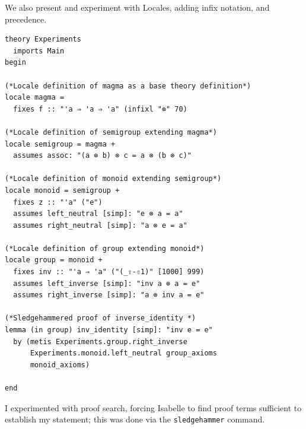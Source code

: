 \documentclass{article}
\begin{document}
We also present and experiment with Locales, adding infix notation,
and precedence.
\begin{lstlisting}
theory Experiments
  imports Main
begin

(*Locale definition of magma as a base theory definition*)
locale magma =
  fixes f :: "'a ⇒ 'a ⇒ 'a" (infixl "⊗" 70)

(*Locale definition of semigroup extending magma*)
locale semigroup = magma +
  assumes assoc: "(a ⊗ b) ⊗ c = a ⊗ (b ⊗ c)"

(*Locale definition of monoid extending semigroup*)
locale monoid = semigroup +
  fixes z :: "'a" ("e")
  assumes left_neutral [simp]: "e ⊗ a = a"
  assumes right_neutral [simp]: "a ⊗ e = a" 

(*Locale definition of group extending monoid*)
locale group = monoid +
  fixes inv :: "'a ⇒ 'a" ("(_⇧-⇧1)" [1000] 999)
  assumes left_inverse [simp]: "inv a ⊗ a = e"
  assumes right_inverse [simp]: "a ⊗ inv a = e"

(*Sledgehammered proof of inverse_identity *)
lemma (in group) inv_identity [simp]: "inv e = e"
  by (metis Experiments.group.right_inverse
      Experiments.monoid.left_neutral group_axioms
      monoid_axioms)

end
\end{lstlisting}

I experimented with proof search, forcing Isabelle to find proof terms sufficient to
establish my statement; this was done via the \texttt{sledgehammer} command.



\end{document}
